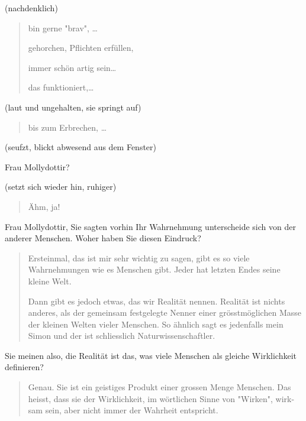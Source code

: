 \documentclass[10pt,titlepage,a5paper]{book}
\newenvironment{tg}{\begin{quote}\em}{\end{quote}}
\begin{document}
 (nachdenklich)
 
 \begin{tg}
 
 bin gerne "brav", \dots 
 
 gehorchen, Pflichten erfüllen, 
 
 immer schön artig sein\dots
 
 das funktioniert,\dots
 
 \end{tg}
 
 (laut und ungehalten, sie springt auf)
 
 \begin{tg}
 
 bis zum Erbrechen, \dots 
 

 \end{tg}
 
 (seufzt, blickt abwesend aus dem Fenster)
 
 Frau Mollydottir?
 
 (setzt sich wieder hin, ruhiger)
 
 \begin{tg}
 
 Ähm, ja!
 
 \end{tg}
 
 Frau Mollydottir, Sie sagten vorhin Ihr Wahrnehmung unterscheide sich von der anderer Menschen. Woher haben Sie diesen Eindruck?
 
 \begin{tg}
 
 Ersteinmal, das ist mir sehr wichtig zu sagen, gibt es so viele Wahrnehmungen wie es Menschen gibt. Jeder hat letzten Endes seine kleine Welt.
 
 Dann gibt es jedoch etwas, das wir Realität nennen. Realität ist nichts anderes, als der gemeinsam festgelegte Nenner einer grösstmöglichen Masse der kleinen Welten vieler Menschen. So ähnlich sagt es jedenfalls mein Simon und der ist schliesslich Naturwissenschaftler.
 
 
 \end{tg}
 
 Sie meinen also, die Realität ist das, was viele Menschen als gleiche Wirklichkeit definieren?
 
 \begin{tg}
 
 Genau. Sie ist ein geistiges Produkt einer grossen Menge Menschen. Das heisst, dass sie der Wirklichkeit, im wörtlichen Sinne von "Wirken", wirk-sam sein, aber nicht immer der Wahrheit entspricht.
 
 \end{tg}
 
\end{document}
